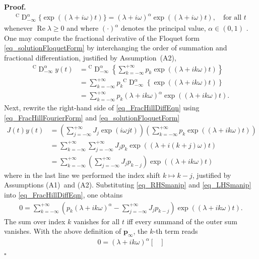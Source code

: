 \documentclass{svproc}
\renewenvironment{proof}[1][Proof]{\par\noindent\textbf{#1.} }{\hfill$\square$\par\vspace{1em}}
\newcommand{\CderivativeInput}[2]{{}^\mathrm{C}\operatorname{D}_{#2}^{#1}}
\newcommand{\pVec}{\mathbf p}
\newcommand{\assp}{(A2)}
\newcommand{\assJ}{(A1)}
\begin{document}
{\begin{proof}
		\begin{align}
			\CderivativeInput{\alpha}{-\infty}\{\exp((\lambda + i\omega)t)\} = (\lambda + i\omega)^\alpha \exp((\lambda + i \omega )t),\quad \text{for all }t
		\end{align}
		whenever $\operatorname{Re}\lambda \geq 0$ and where $(\cdot)^\alpha$ denotes the principal value, $\alpha \in (0,1)$ \cite{samko1993fractional}. One may compute the fractional derivative of the Floquet form \eqref{eq_solutionFloquetForm} by interchanging the order of summation and fractional differentiation, justified by Assumption~\assp,
		\begin{align}
			\CderivativeInput{\alpha}{-\infty}y(t) &= \CderivativeInput{\alpha}{-\infty}\left\{\sum_{k=-\infty}^{+\infty}p_k \exp((\lambda + ik\omega)t)\right\}\\
			&= \sum_{k=-\infty}^{+\infty}p_k \CderivativeInput{\alpha}{-\infty}\left\{\exp((\lambda + ik\omega)t)\right\}\\
			&= \sum_{k=-\infty}^{+\infty}p_k (\lambda + ik\omega)^\alpha \exp((\lambda + ik\omega)t). \label{eq_RHSmanip}
		\end{align}
		Next, rewrite the right-hand side of \eqref{eq_FracHillDiffEqn} using \eqref{eq_FracHillFourierForm} and \eqref{eq_solutionFloquetForm}
		\begin{align}
			J(t)y(t) &= \left(\sum_{j=-\infty}^{+\infty}J_j\exp(i\omega j t)\right)\left(\sum_{k=-\infty}^{+\infty}p_k\exp((\lambda + ik\omega ) t)\right)\\
			&= \sum_{k=-\infty}^{+\infty}\sum_{j=-\infty}^{+\infty}J_jp_k\exp((\lambda + i(k+j)\omega ) t)\\
			&= \sum_{k=-\infty}^{+\infty}\left(\sum_{j=-\infty}^{+\infty}J_jp_{k-j}\right)\exp((\lambda + ik\omega ) t)\label{eq_LHSmanip}
		\end{align}
		where in the last line we performed the index shift $k\mapsto k-j$, justified by Assumptions \assJ~and \assp. Substituting \eqref{eq_RHSmanip} and \eqref{eq_LHSmanip} into \eqref{eq_FracHillDiffEqn}, one obtains
		\begin{align}
			0=\sum_{k=-\infty}^{+\infty}\left(p_k(\lambda + ik\omega)^\alpha-\sum_{j=-\infty}^{+\infty}J_jp_{k-j}\right)\exp((\lambda + ik\omega ) t).
		\end{align}
		The sum over index $k$ vanishes for all $t$ iff every summand of the outer sum vanishes. With the above definition of $\pVec_\infty$, the $k$-th term reads
		\begin{align}\label{eq_kthTermProof}
			0 = (\lambda + ik\omega)^\alpha \begin{bmatrix}

\end{bmatrix}
\end{align}
\end{proof}}
\end{document}
